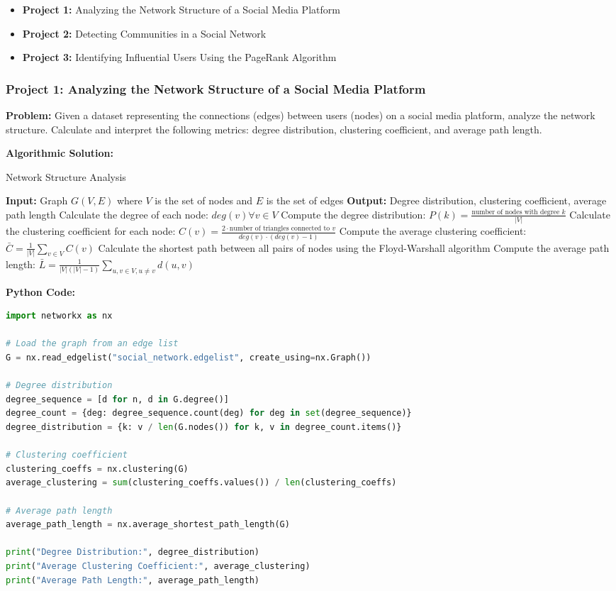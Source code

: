 \documentclass[12pt]{book} %
\begin{document}
\begin{itemize}
    \item \textbf{Project 1:} Analyzing the Network Structure of a Social Media Platform
    \item \textbf{Project 2:} Detecting Communities in a Social Network
    \item \textbf{Project 3:} Identifying Influential Users Using the PageRank Algorithm
\end{itemize}

\subsubsection*{Project 1: Analyzing the Network Structure of a Social Media Platform}
\textbf{Problem:} Given a dataset representing the connections (edges) between users (nodes) on a social media platform, analyze the network structure. Calculate and interpret the following metrics: degree distribution, clustering coefficient, and average path length.

\textbf{Algorithmic Solution:}
\begin{algorithm}
\caption{Network Structure Analysis}
\begin{algorithmic}
\State \textbf{Input:} Graph $G(V, E)$ where $V$ is the set of nodes and $E$ is the set of edges
\State \textbf{Output:} Degree distribution, clustering coefficient, average path length
\State Calculate the degree of each node: $deg(v) \forall v \in V$
\State Compute the degree distribution: $P(k) = \frac{\text{number of nodes with degree } k}{|V|}$
\State Calculate the clustering coefficient for each node: $C(v) = \frac{2 \cdot \text{number of triangles connected to } v}{deg(v) \cdot (deg(v) - 1)}$
\State Compute the average clustering coefficient: $\bar{C} = \frac{1}{|V|} \sum_{v \in V} C(v)$
\State Calculate the shortest path between all pairs of nodes using the Floyd-Warshall algorithm
\State Compute the average path length: $\bar{L} = \frac{1}{|V| (|V|-1)} \sum_{u,v \in V, u \neq v} d(u, v)$
\end{algorithmic}
\end{algorithm}

\FloatBarrier
\textbf{Python Code:}
\begin{lstlisting}[language=Python]
import networkx as nx

# Load the graph from an edge list
G = nx.read_edgelist("social_network.edgelist", create_using=nx.Graph())

# Degree distribution
degree_sequence = [d for n, d in G.degree()]
degree_count = {deg: degree_sequence.count(deg) for deg in set(degree_sequence)}
degree_distribution = {k: v / len(G.nodes()) for k, v in degree_count.items()}

# Clustering coefficient
clustering_coeffs = nx.clustering(G)
average_clustering = sum(clustering_coeffs.values()) / len(clustering_coeffs)

# Average path length
average_path_length = nx.average_shortest_path_length(G)

print("Degree Distribution:", degree_distribution)
print("Average Clustering Coefficient:", average_clustering)
print("Average Path Length:", average_path_length)
\end{lstlisting}
\FloatBarrier
\end{document}
